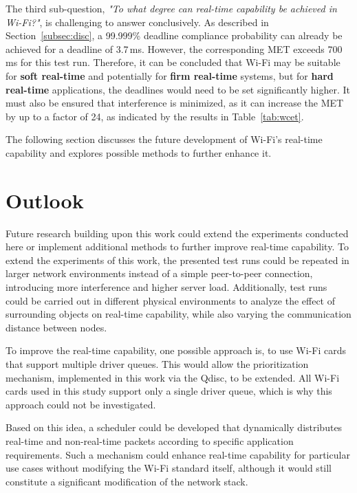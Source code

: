The third sub-question, \textit{"To what degree can real-time capability be achieved in Wi-Fi?"}, is challenging to answer conclusively.  
As described in Section~\ref{subsec:disc}, a 99.999\% deadline compliance probability can already be achieved for a deadline of 3.7\,ms.  
However, the corresponding \ac{MET} exceeds 700\,ms for this test run.  
Therefore, it can be concluded that Wi-Fi may be suitable for \textbf{soft real-time} and potentially for \textbf{firm real-time} systems, but for \textbf{hard real-time} applications, the deadlines would need to be set significantly higher.  
It must also be ensured that interference is minimized, as it can increase the \ac{MET} by up to a factor of 24, as indicated by the results in Table~\ref{tab:wcet}.  

The following section discusses the future development of Wi-Fi's real-time capability and explores possible methods to further enhance it.  

\section{Outlook}
Future research building upon this work could extend the experiments conducted here or implement additional methods to further improve real-time capability.  
To extend the experiments of this work, the presented test runs could be repeated in larger network environments instead of a simple peer-to-peer connection, introducing more interference and higher server load.  
Additionally, test runs could be carried out in different physical environments to analyze the effect of surrounding objects on real-time capability, while also varying the communication distance between nodes.  

To improve the real-time capability, one possible approach is, to use Wi-Fi cards that support multiple driver queues.  
This would allow the prioritization mechanism, implemented in this work via the \ac{Qdisc}, to be extended.  
All Wi-Fi cards used in this study support only a single driver queue, which is why this approach could not be investigated.  

Based on this idea, a scheduler could be developed that dynamically distributes real-time and non-real-time packets according to specific application requirements.  
Such a mechanism could enhance real-time capability for particular use cases without modifying the Wi-Fi standard itself, although it would still constitute a significant modification of the network stack.  

